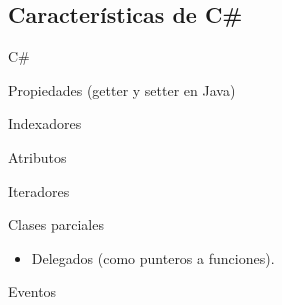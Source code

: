 \documentclass{beamer}
\begin{document}
\subsection{Características de C\#}

\begin{frame}{C\#}
  \begin{exampleblock}{Propiedades (getter y setter en Java)}
    
  \end{exampleblock}
\end{frame}

\begin{frame}
  \begin{exampleblock}{Indexadores}
    
  \end{exampleblock}
\end{frame}

\begin{frame}
  \begin{exampleblock}{Atributos}
    
  \end{exampleblock}
\end{frame}

\begin{frame}
  \begin{exampleblock}{Iteradores}
    \begin{scriptsize}
      
    \end{scriptsize}
  \end{exampleblock}
\end{frame}

\begin{frame}
  \begin{exampleblock}{Clases parciales}
    \begin{scriptsize}
      
    \end{scriptsize}
  \end{exampleblock}
\end{frame}

\begin{frame}
  \begin{itemize}
    \item Delegados (como punteros a funciones).
  \end{itemize}

  \pause
  \begin{exampleblock}{Eventos}
    \begin{scriptsize}
      
    \end{scriptsize}
  \end{exampleblock}
\end{frame}
\end{document}
